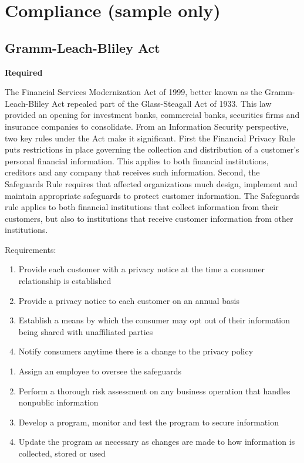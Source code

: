 \documentclass{needs}
\begin{document}
			
			\fTwelveTable
			
		\section{Compliance (sample only)}
		
			\subsection{Gramm-Leach-Bliley Act}
			  {\color{red}\bfseries Required}
			
			The Financial Services Modernization Act of 1999, better known as the Gramm-Leach-Bliley Act repealed part of the Glass-Steagall Act of 1933.  This law provided an opening for investment banks, commercial banks, securities firms and insurance companies to consolidate.
			From an Information Security perspective, two key rules under the Act make it significant.  First the Financial Privacy Rule puts restrictions in place governing the collection and distribution of a customer’s personal financial information.  This applies to both financial institutions, creditors and any company that receives such information.  Second, the Safeguards Rule requires that affected organizations much design, implement and maintain appropriate safeguards to protect customer information.  The Safeguards rule applies to both financial institutions that collect information from their customers, but also to institutions that receive customer information from other institutions.
			
			Requirements:
			
			\begin{enumerate}
				\item Provide each customer with a privacy notice at the time a consumer relationship is established
				\item Provide a privacy notice to each customer on an annual basis
				\item Establish a means by which the consumer may opt out of their information being shared with unaffiliated parties
				\item Notify consumers anytime there is a change to the privacy policy
			\end{enumerate}
			\begin{enumerate}
				\item Assign an employee to oversee the safeguards
				\item Perform a thorough risk assessment on any business operation that handles nonpublic information
				\item Develop a program, monitor and test the program to secure information
				\item Update the program as necessary as changes are made to how information is collected, stored or used
			\end{enumerate}			
\end{document}
